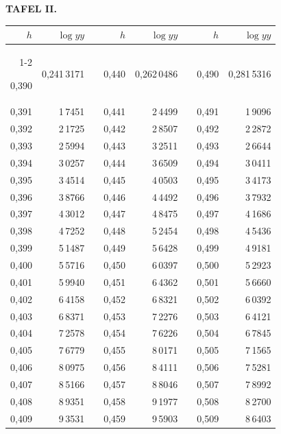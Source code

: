 \endgroup
\clearpage
{}
\begingroup
\centering
\fontsize{9}{9}\selectfont
\setlength{\tabcolsep}{8pt}
\renewcommand{\arraystretch}{1}
\setlength{\parskip}{0pt}
\textbf{TAFEL II.}
\par\vspace{7pt}
\begin{tabular}{|r|r|@{}p{9pt}@{}|r|r|@{}p{9pt}@{}|r|r|}
\hline
\rule{0pt}{8.5pt}\(h\) & \(\log yy\) & & \(h\) & \(\log yy\) & & \(h\) & \(\log yy\) \\
\cline{1-2}\cline{4-5}\cline{7-8}
\rule{0pt}{8.5pt}0,390 & 0,241\,3171 &  & 0,440 & 0,262\,0486 &  & 0,490 & 0,281\,5316 \\
0,391 & 1\,7451 &  & 0,441 & 2\,4499 &  & 0,491 & 1\,9096 \\
0,392 & 2\,1725 &  & 0,442 & 2\,8507 &  & 0,492 & 2\,2872 \\
0,393 & 2\,5994 &  & 0,443 & 3\,2511 &  & 0,493 & 2\,6644 \\
0,394 & 3\,0257 &  & 0,444 & 3\,6509 &  & 0,494 & 3\,0411 \\
0,395 & 3\,4514 &  & 0,445 & 4\,0503 &  & 0,495 & 3\,4173 \\[3pt]
0,396 & 3\,8766 &  & 0,446 & 4\,4492 &  & 0,496 & 3\,7932 \\
0,397 & 4\,3012 &  & 0,447 & 4\,8475 &  & 0,497 & 4\,1686 \\
0,398 & 4\,7252 &  & 0,448 & 5\,2454 &  & 0,498 & 4\,5436 \\
0,399 & 5\,1487 &  & 0,449 & 5\,6428 &  & 0,499 & 4\,9181 \\
0,400 & 5\,5716 &  & 0,450 & 6\,0397 &  & 0,500 & 5\,2923 \\[3pt]
0,401 & 5\,9940 &  & 0,451 & 6\,4362 &  & 0,501 & 5\,6660 \\
0,402 & 6\,4158 &  & 0,452 & 6\,8321 &  & 0,502 & 6\,0392 \\
0,403 & 6\,8371 &  & 0,453 & 7\,2276 &  & 0,503 & 6\,4121 \\
0,404 & 7\,2578 &  & 0,454 & 7\,6226 &  & 0,504 & 6\,7845 \\
0,405 & 7\,6779 &  & 0,455 & 8\,0171 &  & 0,505 & 7\,1565 \\[3pt]
0,406 & 8\,0975 &  & 0,456 & 8\,4111 &  & 0,506 & 7\,5281 \\
0,407 & 8\,5166 &  & 0,457 & 8\,8046 &  & 0,507 & 7\,8992 \\
0,408 & 8\,9351 &  & 0,458 & 9\,1977 &  & 0,508 & 8\,2700 \\
0,409 & 9\,3531 &  & 0,459 & 9\,5903 &  & 0,509 & 8\,6403 \\

\end{tabular}
